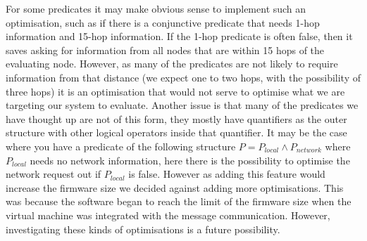 
For some predicates it may make obvious sense to implement such an optimisation, such as if there is a conjunctive predicate that needs 1-hop information and 15-hop information. If the 1-hop predicate is often false, then it saves asking for information from all nodes that are within 15 hops of the evaluating node. However, as many of the predicates are not likely to require information from that distance (we expect one to two hops, with the possibility of three hops) it is an optimisation that would not serve to optimise what we are targeting our system to evaluate. Another issue is that many of the predicates we have thought up are not of this form, they mostly have quantifiers as the outer structure with other logical operators inside that quantifier. It may be the case where you have a predicate of the following structure $P = P_{local} \land P_{network}$ where $P_{local}$ needs no network information, here there is the possibility to optimise the network request out if $P_{local}$ is false. However as adding this feature would increase the firmware size we decided against adding more optimisations. This was because the software began to reach the limit of the firmware size when the virtual machine was integrated with the message communication. However, investigating these kinds of optimisations is a future possibility.

